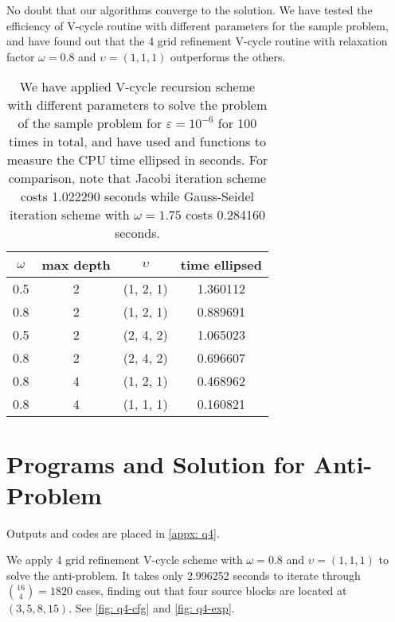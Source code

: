 \documentclass{assignment}[2019/10/15]
\begin{document}
    No doubt that our algorithms converge to the solution. We have tested the efficiency of V-cycle routine with different parameters for the sample problem, and have found out that the 4 grid refinement V-cycle routine with relaxation factor $\omega=0.8$ and $\upsilon = (1, 1, 1)$ outperforms the others.

    \begin{table}[htb]
        \begin{center}
            \caption{We have applied V-cycle recursion scheme with different parameters to solve the problem of the sample problem for $\varepsilon=10^{-6}$ for 100 times in total, and have used  and  functions to measure the CPU time ellipsed in seconds. For comparison, note that Jacobi iteration scheme costs 1.022290 seconds while Gauss-Seidel iteration scheme with $\omega=1.75$ costs 0.284160 seconds.}
            \label{tbl: q3}
            \begin{tabular}{cccc}
                \toprule
                $\omega$ & max depth & $\upsilon$ & time ellipsed\\
                \midrule
                0.5 & 2 & (1, 2, 1) & 1.360112 \\
                0.8 & 2 & (1, 2, 1) & 0.889691 \\
                0.5 & 2 & (2, 4, 2) & 1.065023 \\
                0.8 & 2 & (2, 4, 2) & 0.696607 \\
                0.8 & 4 & (1, 2, 1) & 0.468962 \\
                0.8 & 4 & (1, 1, 1) & 0.160821 \\
                \bottomrule
            \end{tabular}
        \end{center}
    \end{table}

    \section{Programs and Solution for Anti-Problem}

    Outputs and codes are placed in \ref{appx: q4}.

    We apply 4 grid refinement V-cycle scheme with $\omega=0.8$ and $\upsilon=(1, 1, 1)$ to solve the anti-problem. It takes only 2.996252 seconds to iterate through $\binom{16}{4} = 1820$ cases, finding out that four source blocks are located at $(3, 5, 8, 15)$. See \ref{fig: q4-cfg} and \ref{fig: q4-exp}.
\end{document}
